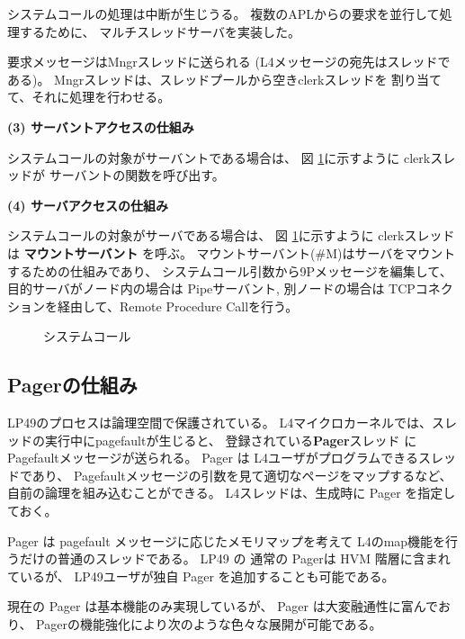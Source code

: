 \documentclass[draft]{ipsjpapers}
\begin{document}
    システムコールの処理は中断が生じうる。
    複数のAPLからの要求を並行して処理するために、
    マルチスレッドサーバを実装した。

    要求メッセージはMngrスレッドに送られる
    (L4メッセージの宛先はスレッドである)。
    Mngrスレッドは、スレッドプールから空きclerkスレッドを
    割り当てて、それに処理を行わせる。


{\bf (3) サーバントアクセスの仕組み}
  
    システムコールの対象がサーバントである場合は、
    図 \ref{fig:LP49syscall}に示すように clerkスレッドが
    サーバントの関数を呼び出す。


{\bf (4) サーバアクセスの仕組み }

    システムコールの対象がサーバである場合は、
    図 \ref{fig:LP49syscall}に示すように
    clerkスレッドは {\bf マウントサーバント} を呼ぶ。
    マウントサーバント(\#M)はサーバをマウントするための仕組みであり、
   システムコール引数から9Pメッセージを編集して、
    目的サーバがノード内の場合は Pipeサーバント,
    別ノードの場合は TCPコネクションを経由して、Remote Procedure Callを行う。


\begin{figure}[htb]
  \begin{center}
   \epsfxsize=340pt
    \caption{システムコール}
    \label{fig:LP49syscall}
  \end{center}
\end{figure}


\subsection{Pagerの仕組み}

  LP49のプロセスは論理空間で保護されている。
  L4マイクロカーネルでは、スレッドの実行中にpagefaultが生じると、
  登録されている{\bf Pager}スレッド にPagefaultメッセージが送られる。
  Pager は L4ユーザがプログラムできるスレッドであり、
  Pagefaultメッセージの引数を見て適切なページをマップするなど、
  自前の論理を組み込むことができる。
  L4スレッドは、生成時に Pager を指定しておく。

  Pager は pagefault メッセージに応じたメモリマップを考えて
  L4のmap機能を行うだけの普通のスレッドである。
  LP49 の 通常の Pagerは HVM 階層に含まれているが、
  LP49ユーザが独自 Pager を追加することも可能である。

  現在の Pager は基本機能のみ実現しているが、
  Pager は大変融通性に富んでおり、
  Pagerの機能強化により次のような色々な展開が可能である。
\end{document}
